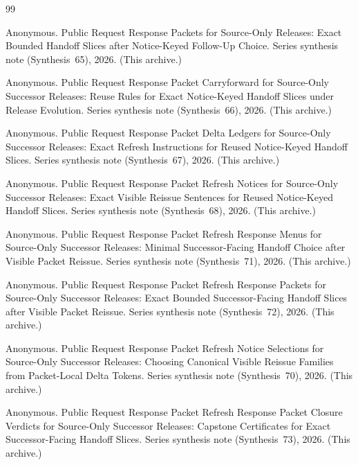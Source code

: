 \documentclass[11pt]{article}
\begin{document}
\begin{thebibliography}{99}\small

Anonymous.
\newblock Public Request Response Packets for Source-Only Releases: Exact Bounded Handoff Slices after Notice-Keyed Follow-Up Choice.
\newblock Series synthesis note (Synthesis~65), 2026. (This archive.)

Anonymous.
\newblock Public Request Response Packet Carryforward for Source-Only Successor Releases: Reuse Rules for Exact Notice-Keyed Handoff Slices under Release Evolution.
\newblock Series synthesis note (Synthesis~66), 2026. (This archive.)

Anonymous.
\newblock Public Request Response Packet Delta Ledgers for Source-Only Successor Releases: Exact Refresh Instructions for Reused Notice-Keyed Handoff Slices.
\newblock Series synthesis note (Synthesis~67), 2026. (This archive.)

Anonymous.
\newblock Public Request Response Packet Refresh Notices for Source-Only Successor Releases: Exact Visible Reissue Sentences for Reused Notice-Keyed Handoff Slices.
\newblock Series synthesis note (Synthesis~68), 2026. (This archive.)

Anonymous.
\newblock Public Request Response Packet Refresh Response Menus for Source-Only Successor Releases: Minimal Successor-Facing Handoff Choice after Visible Packet Reissue.
\newblock Series synthesis note (Synthesis~71), 2026. (This archive.)

Anonymous.
\newblock Public Request Response Packet Refresh Response Packets for Source-Only Successor Releases: Exact Bounded Successor-Facing Handoff Slices after Visible Packet Reissue.
\newblock Series synthesis note (Synthesis~72), 2026. (This archive.)

Anonymous.
\newblock Public Request Response Packet Refresh Notice Selections for Source-Only Successor Releases: Choosing Canonical Visible Reissue Families from Packet-Local Delta Tokens.
\newblock Series synthesis note (Synthesis~70), 2026. (This archive.)

Anonymous.
\newblock Public Request Response Packet Refresh Response Packet Closure Verdicts for Source-Only Successor Releases: Capstone Certificates for Exact Successor-Facing Handoff Slices.
\newblock Series synthesis note (Synthesis~73), 2026. (This archive.)


\end{thebibliography}
\end{document}
